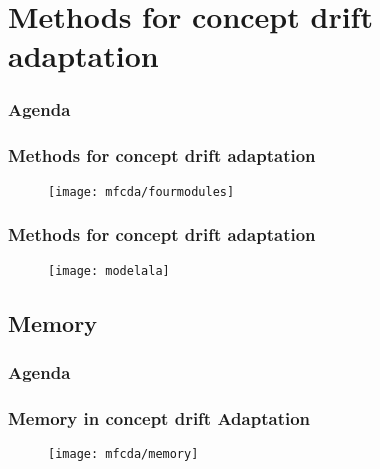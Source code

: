 \section{Methods for concept drift adaptation}
\begin{frame}
\frametitle{Agenda}
\tableofcontents[currentsection]
\end{frame}


\begin{frame}
\frametitle{Methods for concept drift adaptation}

\begin{figure}[H]
	\centering
	\texttt{[image: mfcda/fourmodules]}
\end{figure}

\end{frame}


\begin{frame}
\frametitle{Methods for concept drift adaptation}

\begin{figure}[H]
	\centering
	\texttt{[image: modelala]}
\end{figure}

\end{frame}

\subsection{Memory}

\begin{frame}
\frametitle{Agenda}
\tableofcontents[currentsubsection]
\end{frame}

\begin{frame}
\frametitle{Memory in concept drift Adaptation}

\begin{figure}[H]
	\centering
	\texttt{[image: mfcda/memory]}
\end{figure}

\end{frame}


